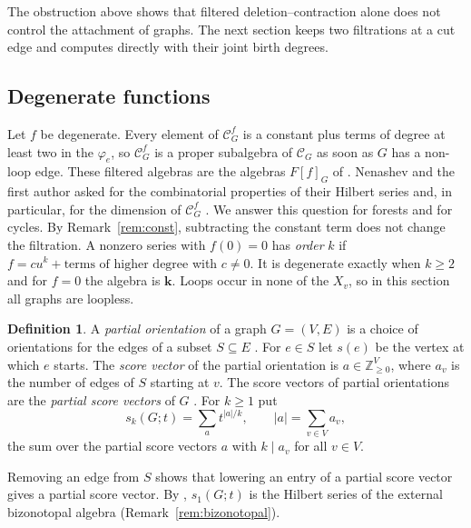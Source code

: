 \documentclass[reqno]{article}
\theoremstyle{plain} %
\theoremstyle{definition}
\newtheorem{definition}[theorem]{Definition}
\theoremstyle{remark}
\newcommand{\Z}{{\mathbb{Z}}}
\newcommand{\K} {\mathbf{k}}
\newcommand {\CC}{\mathscr{C}}
\numberwithin{equation}{section}
\begin{document}
The obstruction above shows that filtered deletion--contraction alone
does not control the attachment of graphs. The next section keeps two
filtrations at a cut edge and computes directly with their joint birth
degrees.


\subsection{Degenerate functions}
\label{sec:degenerate}

Let $f$ be degenerate. Every element of $\CC_G^f$ is a constant plus
terms of degree at least two in the $\varphi_e$, so $\CC_G^f$ is a proper
subalgebra of $\CC_G$ as soon as $G$ has a non-loop edge. These filtered
algebras are the algebras $F[f]_G$ of \cite[Section~3]{NSh}. Nenashev
and the first author asked for the combinatorial properties of their
Hilbert series and, in particular, for the dimension of $\CC_G^f$
\cite[Problem~4]{NSh}. We answer this question for forests and for
cycles. By Remark~\ref{rem:const}, subtracting the constant term does not
change the filtration. A nonzero series with $f(0)=0$ has
\emph{order} $k$ if $f=cu^k+\text{terms of higher degree}$ with
$c\ne0$. It is degenerate exactly when $k\ge2$ and for $f=0$ the algebra is $\K$. Loops occur in
none of the $X_v$, so in this section all graphs are loopless.

\begin{definition}\label{def:partial-score}
A \emph{partial orientation} of a graph $G=(V,E)$ is a choice of
orientations for the edges of a subset $S\subseteq E$
\cite[Definition~2.1]{KNSV}. For $e\in S$ let $s(e)$ be the vertex at
which $e$ starts. The \emph{score vector} of the partial orientation is
$a\in\Z_{\ge0}^V$, where $a_v$ is the number of edges of $S$ starting at
$v$. The score vectors of partial orientations are the \emph{partial
score vectors} of $G$ \cite[Definition~2.4]{KNSV}. For $k\ge1$ put
\[
 s_k(G;t)=\sum_a t^{|a|/k},\qquad |a|=\sum_{v\in V}a_v,
\]
the sum over the partial score vectors $a$ with $k\mid a_v$ for all
$v\in V$.
\end{definition}

Removing an edge from $S$ shows that lowering an entry of a partial score
vector gives a partial score vector. By \cite[Corollary~2.6]{KNSV},
$s_1(G;t)$ is the Hilbert series of the external bizonotopal algebra
(Remark~\ref{rem:bizonotopal}).
\end{document}

